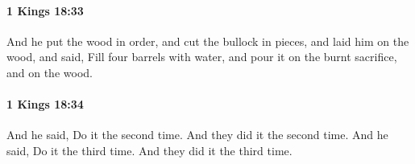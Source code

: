		\paragraph{1 Kings 18:33} %
			\label{1KINGS-18-33}

			And he put the wood in order, and cut the bullock in pieces, and laid him on the wood, and said, Fill four barrels with water, and pour it on the burnt sacrifice, and on the wood.


		\paragraph{1 Kings 18:34} %
			\label{1KINGS-18-34}

			And he said, Do it the second time. And they did it the second time. And he said, Do it the third time. And they did it the third time.


